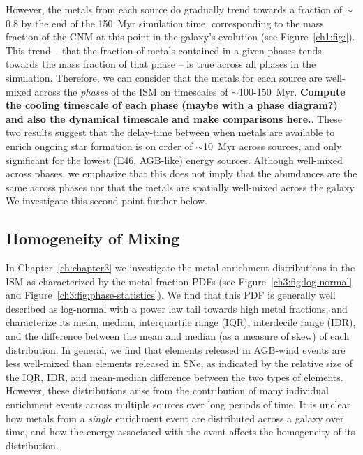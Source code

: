 However, the metals from each source do gradually trend towards a fraction of $\sim$0.8 by the end of the 150~Myr simulation time, corresponding to the mass fraction of the CNM at this point in the galaxy's evolution (see Figure~\ref{ch1:fig:}). This trend -- that the fraction of metals contained in a given phases tends towards the mass fraction of that phase -- is true across all phases in the simulation. Therefore, we can consider that the metals for each source are well-mixed across the \textit{phases} of the ISM on timescales of $\sim$100-150~Myr. \textbf{Compute the cooling timescale of each phase (maybe with a phase diagram?) and also the dynamical timescale and make comparisons here.}. These two results suggest that the delay-time between when metals are available to enrich ongoing star formation is on order of $\sim$10~Myr across sources, and only significant for the lowest (E46, AGB-like) energy sources. Although well-mixed across phases, we emphasize that this does not imply that the abundances are the same across phases nor that the metals are spatially well-mixed across the galaxy. We investigate this second point further below.

\subsection{Homogeneity of Mixing}
\label{ch4:sec:spreads}

In Chapter~\ref{ch:chapter3} we investigate the metal enrichment distributions in the ISM as characterized by the metal fraction PDFs (see Figure~\ref{ch3:fig:log-normal} and Figure~\ref{ch3:fig:phase-statistics}). We find that this PDF is generally well described as log-normal with a power law tail towards high metal fractions, and characterize its mean, median, interquartile range (IQR), interdecile range (IDR), and the difference between the mean and median (as a measure of skew) of each distribution. In general, we find that elements released in AGB-wind events are less well-mixed than elements released in SNe, as indicated by the relative size of the IQR, IDR, and mean-median difference between the two types of elements. However, these distributions arise from the contribution of many individual enrichment events across multiple sources over long periods of time. It is unclear how metals from a \textit{single} enrichment event are distributed across a galaxy over time, and how the energy associated with the event affects the homogeneity of its distribution.

